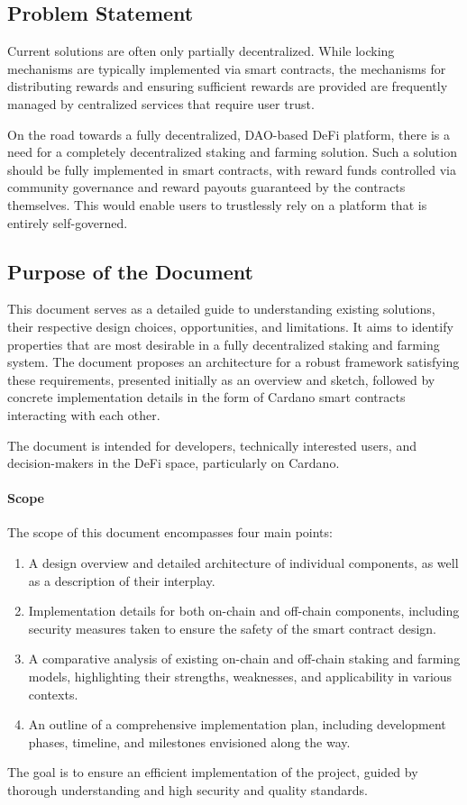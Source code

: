 \documentclass[12pt,parskip=full, tikz]{article}
\begin{document}
\subsection{Problem Statement}

Current solutions are often only partially decentralized. While locking mechanisms are typically implemented via smart contracts, the mechanisms for distributing rewards and ensuring sufficient rewards are provided are frequently managed by centralized services that require user trust. 

On the road towards a fully decentralized, DAO-based DeFi platform, there is a need for a completely decentralized staking and farming solution. Such a solution should be fully implemented in smart contracts, with reward funds controlled via community governance and reward payouts guaranteed by the contracts themselves. This would enable users to trustlessly rely on a platform that is entirely self-governed.

\subsection{Purpose of the Document}

This document serves as a detailed guide to understanding existing solutions, their respective design choices, opportunities, and limitations. It aims to identify properties that are most desirable in a fully decentralized staking and farming system. The document proposes an architecture for a robust framework satisfying these requirements, presented initially as an overview and sketch, followed by concrete implementation details in the form of Cardano smart contracts interacting with each other. 

The document is intended for developers, technically interested users, and decision-makers in the DeFi space, particularly on Cardano.

\paragraph{Scope} The scope of this document encompasses four main points:
\begin{enumerate}
    \item A design overview and detailed architecture of individual components, as well as a description of their interplay.
    \item Implementation details for both on-chain and off-chain components, including security measures taken to ensure the safety of the smart contract design.
    \item A comparative analysis of existing on-chain and off-chain staking and farming models, highlighting their strengths, weaknesses, and applicability in various contexts.
    \item An outline of a comprehensive implementation plan, including development phases, timeline, and milestones envisioned along the way.
\end{enumerate}
The goal is to ensure an efficient implementation of the project, guided by thorough understanding and high security and quality standards.
\end{document}
